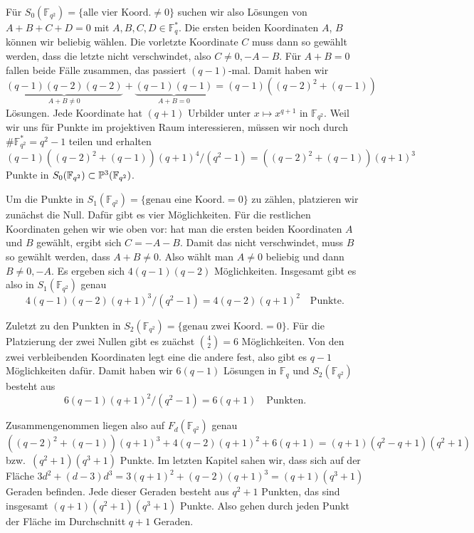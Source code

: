 Für $S_0(\mathbb F_{q^2}) = \{\text{alle vier Koord.}\neq 0\}$ suchen wir also Lösungen von $A+B+C+D=0$ mit $A,B,C,D \in \mathbb F_q^*$. Die ersten beiden Koordinaten $A$, $B$ können wir beliebig wählen. Die vorletzte Koordinate $C$ muss dann so gewählt werden, dass die letzte nicht verschwindet, also $C \neq 0, -A-B$. Für $A+B=0$ fallen beide Fälle zusammen, das passiert $(q-1)$-mal. Damit haben wir
\begin{equation*}
\underbrace{(q-1)(q-2)(q-2)}_{A+B \neq 0} + \underbrace{(q-1)(q-1)}_{A+B=0} = (q-1)((q-2)^2+(q-1))
\end{equation*}
Lösungen. Jede Koordinate hat $(q+1)$ Urbilder unter $x \mapsto x^{q+1}$ in $\mathbb F_{q^2}$. Weil wir uns für Punkte im projektiven Raum interessieren, müssen wir noch durch $\#\mathbb F_{q^2}^* = q^2-1$ teilen und erhalten
\begin{equation}
(q-1)((q-2)^2+(q-1))(q+1)^4/(q^2-1) = ((q-2)^2+(q-1))(q+1)^3
\end{equation}
Punkte in $S_0(\mathbb F_{q^2}) \subset \mathbb P^{3}(\mathbb F_{q^2})$.

Um die Punkte in $S_1(\mathbb F_{q^2}) = \{\text{genau eine Koord.}= 0\}$ zu zählen, platzieren wir zunächst die Null. Dafür gibt es vier Möglichkeiten. Für die restlichen Koordinaten gehen wir wie oben vor: hat man die ersten beiden Koordinaten $A$ und $B$ gewählt, ergibt sich $C=-A-B$. Damit das nicht verschwindet, muss $B$ so gewählt werden, dass $A+B \neq 0$. Also wählt man $A \neq 0$ beliebig und dann $B \neq 0, -A$. Es ergeben sich $4(q-1)(q-2)$ Möglichkeiten. Insgesamt gibt es also in $S_1(\mathbb F_{q^2})$ genau
\begin{equation}
4(q-1)(q-2)(q+1)^3/(q^2-1) = 4(q-2)(q+1)^2 \quad\text{Punkte.}
\end{equation}

Zuletzt zu den Punkten in $S_2(\mathbb F_{q^2}) = \{\text{genau zwei Koord.}= 0\}$. Für die Platzierung der zwei Nullen gibt es zuächst $\binom 4 2 = 6$ Möglichkeiten. Von den zwei verbleibenden Koordinaten legt eine die andere fest, also gibt es $q-1$ Möglichkeiten dafür. Damit haben wir $6(q-1)$ Lösungen in $\mathbb F_q$ und $S_2(\mathbb F_{q^2})$ besteht aus
\begin{equation}
6(q-1)(q+1)^2/(q^2-1) = 6(q+1) \quad\text{Punkten.}
\end{equation}

Zusammengenommen liegen also auf $F_d(\mathbb F_{q^2})$ genau
\begin{equation}
((q-2)^2+(q-1))(q+1)^3 + 4(q-2)(q+1)^2 + 6(q+1) = (q+1)(q^2-q+1)(q^2+1)
\end{equation}
bzw.~$(q^2+1)(q^3+1)$ Punkte. Im letzten Kapitel sahen wir, dass sich auf der Fläche $3d^2 + (d-3)d^3 = 3(q+1)^2 + (q-2)(q+1)^3 = (q+1)(q^3+1)$ Geraden befinden. Jede dieser Geraden besteht aus $q^2+1$ Punkten, das sind insgesamt $(q+1)(q^2+1)(q^3+1)$ Punkte. Also gehen durch jeden Punkt der Fläche im Durchschnitt $q+1$ Geraden.

